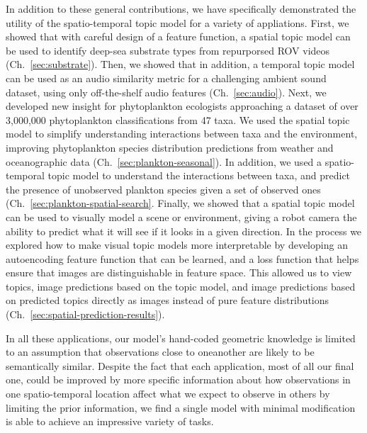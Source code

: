 In addition to these general contributions, we have specifically demonstrated the utility of the spatio-temporal topic model for a variety of appliations. First, we showed that with careful design of a feature function, a spatial topic model can be used to identify deep-sea substrate types from repurporsed ROV videos (Ch.~\ref{sec:substrate}). Then, we showed that in addition, a temporal topic model can be used as an audio similarity metric for a challenging ambient sound dataset, using only off-the-shelf audio features (Ch.~\ref{sec:audio}). Next, we developed new insight for phytoplankton ecologists approaching a dataset of over 3,000,000 phytoplankton classifications from 47 taxa. We used the spatial topic model to simplify understanding interactions between taxa and the environment, improving phytoplankton species distribution predictions from weather and oceanographic data (Ch.~\ref{sec:plankton-seasonal}). In addition, we used a spatio-temporal topic model to understand the interactions between taxa, and predict the presence of unobserved plankton species given a set of observed ones (Ch.~\ref{sec:plankton-spatial-search}. Finally, we showed that a spatial topic model can be used to visually model a scene or environment, giving a robot camera the ability to predict what it will see if it looks in a given direction. In the process we explored how to make visual topic models more interpretable by developing an autoencoding feature function that can be learned, and a loss function that helps ensure that images are distinguishable in feature space. This allowed us to view topics, image predictions based on the topic model, and image predictions based on predicted topics directly as images instead of pure feature distributions (Ch.~\ref{sec:spatial-prediction-results}).

In all these applications, our model's hand-coded geometric knowledge is limited to an assumption that observations close to oneanother are likely to be semantically similar. Despite the fact that each application, most of all our final one, could be improved by more specific information about how observations in one spatio-temporal location affect what we expect to observe in others by limiting the prior information, we find a single model with minimal modification is able to achieve an impressive variety of tasks.

